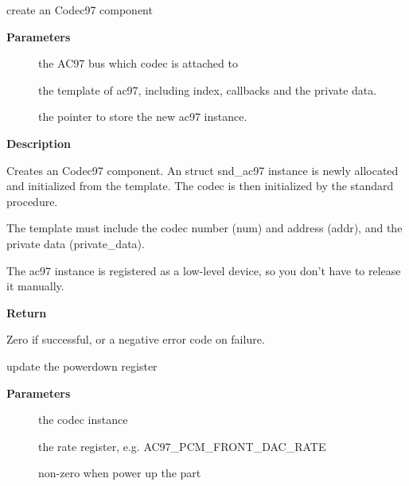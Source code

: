 \documentclass[a4paper,8pt,english]{sphinxmanual}
\begin{document}
\begin{fulllineitems}
\label{sound/kernel-api/alsa-driver-api:c.snd_ac97_mixer}
create an Codec97 component

\end{fulllineitems}


\textbf{Parameters}
\begin{description}
\item[{}] \leavevmode
the AC97 bus which codec is attached to

\item[{}] \leavevmode
the template of ac97, including index, callbacks and
the private data.

\item[{}] \leavevmode
the pointer to store the new ac97 instance.

\end{description}

\textbf{Description}

Creates an Codec97 component.  An struct snd\_ac97 instance is newly
allocated and initialized from the template.  The codec
is then initialized by the standard procedure.

The template must include the codec number (num) and address (addr),
and the private data (private\_data).

The ac97 instance is registered as a low-level device, so you don't
have to release it manually.

\textbf{Return}

Zero if successful, or a negative error code on failure.

\begin{fulllineitems}
\label{sound/kernel-api/alsa-driver-api:c.snd_ac97_update_power}
update the powerdown register

\end{fulllineitems}


\textbf{Parameters}
\begin{description}
\item[{}] \leavevmode
the codec instance

\item[{}] \leavevmode
the rate register, e.g. AC97\_PCM\_FRONT\_DAC\_RATE

\item[{}] \leavevmode
non-zero when power up the part

\end{description}
\end{document}
